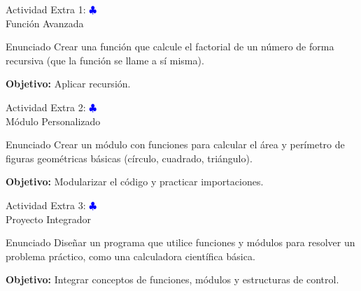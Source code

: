 \documentclass[10pt]{beamer}
\begin{document}
\begin{frame}{Actividad Extra 1: \hfill \textcolor{blue}{$\clubsuit$} \\
Función Avanzada}
  \begin{block}{Enunciado}
    Crear una función que calcule el factorial de un número de forma recursiva (que la función se llame a sí misma).
  \end{block}
  \textbf{Objetivo:} Aplicar recursión.
\end{frame}

\begin{frame}{Actividad Extra 2: \hfill \textcolor{blue}{$\clubsuit$} \\
Módulo Personalizado}
  \begin{block}{Enunciado}
    Crear un módulo con funciones para calcular el área y perímetro de figuras geométricas básicas (círculo, cuadrado, triángulo).
  \end{block}
  \textbf{Objetivo:} Modularizar el código y practicar importaciones.
\end{frame}

\begin{frame}{Actividad Extra 3: \hfill \textcolor{blue}{$\clubsuit$} \\
Proyecto Integrador}
  \begin{block}{Enunciado}
    Diseñar un programa que utilice funciones y módulos para resolver un problema práctico, como una calculadora científica básica.
  \end{block}
  \textbf{Objetivo:} Integrar conceptos de funciones, módulos y estructuras de control.
\end{frame}
\end{document}

